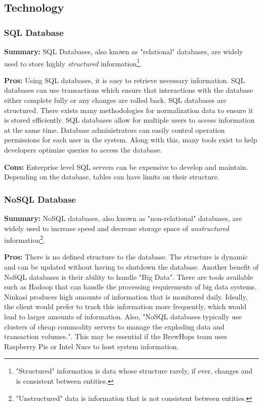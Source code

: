 \documentclass[draftclsnofoot,onecolumn,letterpaper,10pt,compsoc]{IEEEtran}
\begin{document}
      \subsection{Technology}
  			\subsubsection{SQL Database}
		        \textbf{Summary:}
		            SQL Databases, also known as "relational" databases, are widely used to store highly \textit{structured} information\footnote{"Structured" information is data whose structure rarely, if ever, changes and is consistent between entities.}.

		        \noindent \textbf{Pros:}
		            Using SQL databases, it is easy to retrieve necessary information.
		            SQL databases can use transactions which ensure that interactions with the database either complete fully or any changes are rolled back.
		            SQL databases are structured.
		            There exists many methodologies for normalization data to ensure it is stored efficiently\cite{TechwallaSQL}.
		            SQL databases allow for multiple users to access information at the same time\cite{TechwallaSQLPros}.
		            Database administrators can easily control operation permissions for each user in the system.
		            Along with this, many tools exist to help developers optimize queries to access the database.

		        \noindent \textbf{Cons:}
		            Enterprise level SQL servers can be expensive to develop and maintain.
		            Depending on the database, tables can have limits on their structure\cite{TechwallaSQLCons}.


  			\subsubsection{NoSQL Database}
		        \textbf{Summary:}
		            NoSQL databases, also known as "non-relational" databases, are widely used to increase speed and decrease storage space of \textit{unstructured} information\footnote{"Unstructured" data is information that is not consistent between entities.}.

		        \noindent \textbf{Pros:}
		            There is no defined structure to the database.
		            The structure is dynamic and can be updated without having to shutdown the database\cite{MongoDBProsCons}.
		            Another benefit of NoSQL databases is their ability to handle "Big Data".
		            There are tools available such as Hadoop that can handle the processing requirements of big data systems\cite{NoSQLProsCons}.
		            Ninkasi produces high amounts of information that is monitored daily.
		            Ideally, the client would prefer to track this information more frequently, which would lead to larger amounts of information.
		            Also, "NoSQL databases typically use clusters of cheap commodity servers to manage the exploding data and transaction volumes."\cite{NoSQLProsCons}.
		            This may be essential if the BrewHops team uses Raspberry Pis or Intel Nucs to host system information.
\end{document}
